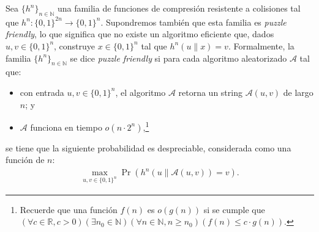 
Sea $\{h^n\}_{n \in \mathbb{N}}$ una familia de funciones de
compresión resistente a colisiones tal que $h^n
: \{0,1\}^{2n} \to \{0,1\}^{n}$. Supondremos también que esta familia
es \textit{puzzle friendly}, lo que significa que no existe un
algoritmo eficiente que, dados $u, v \in \{0,1\}^n$, construye
$x \in \{0,1\}^n$ tal que $h^n(u \| x) = v$. Formalmente, la familia
$\{h^n\}_{n \in \mathbb{N}}$ se dice \textit{puzzle friendly} si para
cada algoritmo aleatorizado $\mathcal{A}$ tal que:
\begin{itemize}
\item con entrada $u, v \in \{0,1\}^n$, el algoritmo $\mathcal{A}$ retorna un string $\mathcal{A}(u, v)$ de largo $n$; y 

\item $\mathcal{A}$ funciona en tiempo $o(n \cdot 2^n)$,\footnote{Recuerde que una función $f(n)$ es $o(g(n))$ si se cumple que $(\forall c \in \mathbb{R}, c > 0)(\exists n_0 \in \mathbb{N})(\forall n \in \mathbb{N}, n \geq n_0)(f(n) \leq c \cdot g(n))$.}
\end{itemize}
se tiene que la siguiente probabilidad es despreciable, considerada como una función de $n$:
\begin{eqnarray*}
\max_{u, v \in \{0,1\}^n} \Pr(h^n(u \| \mathcal{A}(u,v))=v).
\end{eqnarray*}


